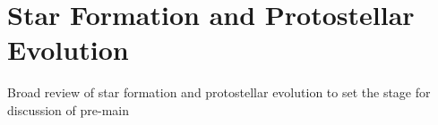 \section{Star Formation and Protostellar Evolution}
Broad review of star formation and protostellar evolution to set the stage for discussion of pre-main